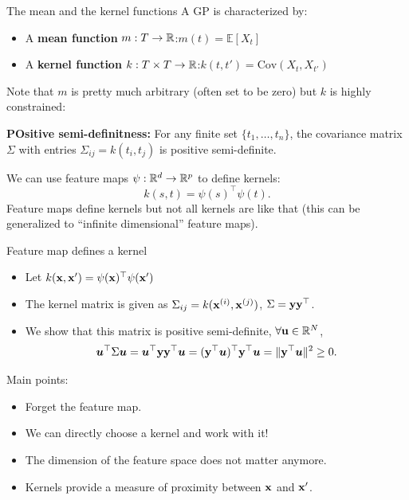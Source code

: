 \documentclass[11pt,handout,aspectratio=169]{beamer}
\begin{document}
\begin{frame}{The mean and the kernel functions}
	A GP is characterized  by:
    \begin{itemize}
        \item A \textbf{mean function} $m:T\to \mathbb R$:\quad  \( m(t) = \mathbb{E}[X_t] \)
        \item A \textbf{kernel function} $k:T\times T\to \mathbb R$:\quad  \( k(t, t') = \text{Cov}(X_t, X_{t'}) \)
    \end{itemize}
 \begin{exampleblock}{}
 	Note that $m$ is pretty much arbitrary (often set to be zero) but $k$ is highly constrained:
 	
 	\textbf{POsitive semi-definitness:} For any finite set \( \{t_1, \dots, t_n\} \), the covariance matrix \( \Sigma \) with entries \( \Sigma_{ij} = k(t_i, t_j) \) is positive semi-definite.
 \end{exampleblock} 
 We can use feature maps $\psi:\mathbb R^d\to \mathbb R^p$ to define kernels: 
  $$k(s,t) = \psi(s)^\top\psi(t).$$ 
Feature maps define kernels but not all kernels are like that (this can be generalized to ``infinite dimensional'' feature maps).
\end{frame}


\begin{frame}{Feature map defines a kernel}
\begin{itemize}
\item Let $k(\mathbf{x},\mathbf{x}') =  \psi(\mathbf{x})^\top \psi(\mathbf{x}') $
  \item The kernel matrix is given as $\Sigma_{ij} = k(\mathbf{x}^{(i)},\mathbf{x}^{(j)})$, $\Sigma=\mathbf{y}\mathbf{y}^\top$.
  \item
  We show that this matrix is positive semi-definite, $\forall \mathbf u \in \mathbb R^N$, 
  $$
    \boldsymbol u^\top \Sigma \boldsymbol u = \boldsymbol u^\top \mathbf{y}\mathbf{y}^\top\boldsymbol u=(\mathbf{y}^\top \boldsymbol u)^\top \mathbf{y}^\top \boldsymbol u=\|\mathbf{y}^\top \boldsymbol u\|^2\geq0.
  $$	
\end{itemize}
Main points:

\begin{itemize}
\item Forget the feature map.
	\item We can directly choose a kernel and work with it!
	\item The dimension of the feature space does not matter anymore.
  \item Kernels provide a measure of proximity between $\mathbf{x}$ and $\mathbf{x}'$.
\end{itemize}
\end{frame}
\end{document}
